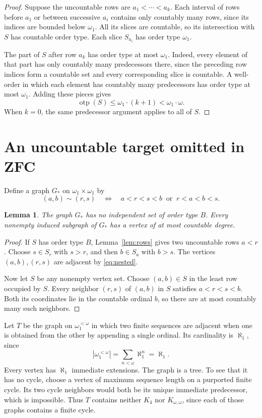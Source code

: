 \documentclass[10pt,letterpaper,leqno]{amsart}
\numberwithin{equation}{section}
\newtheorem{lemma}[theorem]{Lemma}
\theoremstyle{definition}
\theoremstyle{remark}
\newcommand{\otp}{\operatorname{otp}}
\begin{document}
\begin{proof}
Suppose the uncountable rows are $a_1<\cdots<a_k$.
Each interval of rows before $a_1$ or between successive $a_i$ contains
only countably many rows, since its indices are bounded below $\omega_1$.
All its slices are countable, so its intersection with $S$ has countable
order type. Each slice $S_{a_i}$ has order type $\omega_1$.

The part of $S$ after row $a_k$ has order type at most $\omega_1$.
Indeed, every element of that part has only countably many predecessors
there, since the preceding row indices form a countable set and every
corresponding slice is countable. A well-order in which each element has
countably many predecessors has order type at most $\omega_1$.
Adding these pieces gives
\[
 \otp(S)\le \omega_1\cdot(k+1)<\omega_1\cdot\omega.
\]
When $k=0$, the same predecessor argument applies to all of $S$.
\end{proof}

\section{An uncountable target omitted in ZFC}

Define a graph $G_*$ on $\omega_1\times\omega_1$ by
\begin{equation}\label{eq:nested}
 (a,b)\sim(r,s)
 \quad\Longleftrightarrow\quad
 a<r<s<b\ \text{ or }\ r<a<b<s.
\end{equation}

\begin{lemma}\label{lem:full-nested}
The graph $G_*$ has no independent set of order type $B$.
Every nonempty induced subgraph of $G_*$ has a vertex of at most countable
degree.
\end{lemma}

\begin{proof}
If $S$ has order type $B$, Lemma~\ref{lem:rows} gives two uncountable rows
$a<r$. Choose $s\in S_r$ with $s>r$, and then $b\in S_a$ with $b>s$.
The vertices $(a,b),(r,s)$ are adjacent by \eqref{eq:nested}.

Now let $S$ be any nonempty vertex set. Choose $(a,b)\in S$ in the least
row occupied by $S$. Every neighbor $(r,s)$ of $(a,b)$ in $S$ satisfies
$a<r<s<b$. Both its coordinates lie in the countable ordinal $b$, so
there are at most countably many such neighbors.
\end{proof}

Let $T$ be the graph on $\omega_1^{<\omega}$ in which two finite sequences
are adjacent when one is obtained from the other by appending a single
ordinal. Its cardinality is $\aleph_1$, since
\[
 |\omega_1^{<\omega}|=\sum_{n<\omega}\aleph_1^n=\aleph_1.
\]
Every vertex has $\aleph_1$ immediate extensions. The graph is a tree.
To see that it has no cycle, choose a vertex of maximum sequence length
on a purported finite cycle. Its two cycle neighbors would both be its
unique immediate predecessor, which is impossible.
Thus $T$ contains neither $K_4$ nor $K_{\omega,\omega}$, since each of
those graphs contains a finite cycle.
\end{document}
